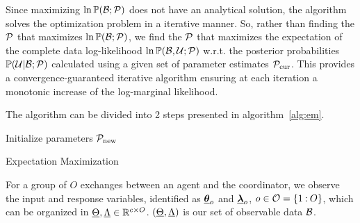 \documentclass{ifacconf}  %
\begin{document}
Since maximizing ${\ln\mathbb{P}(\mathcal{B};\mathcal{P})}$ does not have an analytical solution, the algorithm solves the optimization problem in a iterative manner.
So, rather than finding the $\mathcal{P}$ that maximizes ${\ln\mathbb{P}(\mathcal{B};\mathcal{P})}$, we find the $\mathcal{P}$ that maximizes the expectation of the complete data log-likelihood $\ln\mathbb{P}(\mathcal{B},\mathcal{U};\mathcal{P})$ w.r.t.
the posterior probabilities ${\mathbb{P}(\mathcal{U}|\mathcal{B};\mathcal{P})}$
calculated using a given set of parameter estimates $\mathcal{P}_{\mathrm{cur}}$.
This provides a convergence-guaranteed iterative algorithm ensuring at each iteration a monotonic increase of the log-marginal likelihood.

The algorithm can be divided into 2 steps presented in algorithm~\ref{alg:em}.

\begin{algorithm2e}[h]
  \DontPrintSemicolon%
  Initialize parameters $\mathcal{P}_{\mathrm{new}}$\;
 \caption{Expectation Maximization}\label{alg:em}
\end{algorithm2e}

For a group of $O$ exchanges between an agent and the coordinator, we observe the input and response variables, identified as  ${\underline{\boldsymbol{\theta}}_{o}}$ and ${\underline{\boldsymbol{\lambda}}_{o}}$, ${o\in\mathcal{O}=\{1\mathbin{:}O\}}$, which can be organized in ${\underline{\Theta},\underline{\Lambda}\in\mathbb{R}^{c\times O}}$. ${(\underline{\Theta},\underline{\Lambda})}$ is our set of observable data $\mathcal{B}$.
\end{document}
